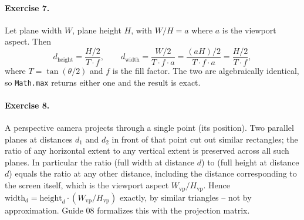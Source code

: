 \documentclass{article}
\begin{document}
\paragraph{Exercise 7.} Let plane width $W$, plane height $H$, with
$W/H = a$ where $a$ is the viewport aspect. Then
\[
  d_{\text{height}} = \frac{H/2}{T \cdot f}, \qquad
  d_{\text{width}}  = \frac{W/2}{T \cdot f \cdot a}
                    = \frac{(aH)/2}{T \cdot f \cdot a}
                    = \frac{H/2}{T \cdot f},
\]
where $T = \tan(\theta/2)$ and $f$ is the fill factor. The two are
algebraically identical, so \lstinline{Math.max} returns either one and the
result is exact.

\paragraph{Exercise 8.} A perspective camera projects through a single point
(its position). Two parallel planes at distances $d_1$ and $d_2$ in front of
that point cut out similar rectangles; the ratio of any horizontal extent to
any vertical extent is preserved across all such planes. In particular the
ratio (full width at distance $d$) to (full height at distance $d$) equals the
ratio at any other distance, including the distance corresponding to the
screen itself, which is the viewport aspect $W_{\text{vp}}/H_{\text{vp}}$.
Hence $\text{width}_d = \text{height}_d \cdot (W_{\text{vp}}/H_{\text{vp}})$
exactly, by similar triangles -- not by approximation. Guide 08 formalizes
this with the projection matrix.
\end{document}
